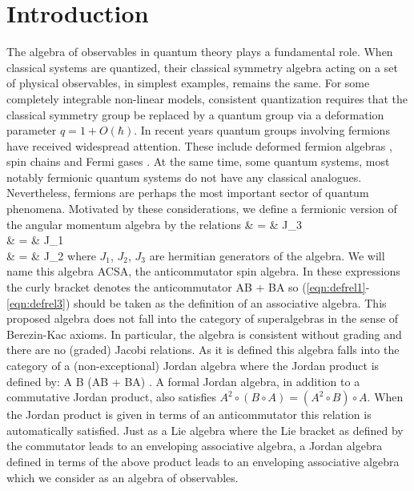 
\section{Introduction}

The algebra of observables in quantum theory plays a fundamental
role. When classical systems are quantized, their classical
symmetry algebra acting on a set of physical observables, in
simplest examples, remains the same. For some completely
integrable non-linear models, consistent quantization requires
that the classical symmetry group be replaced by a quantum group
\cite{frt,drinfeld,woronowicz,manin} via a deformation parameter
$q = 1 + O(\hbar)$. In recent years quantum groups involving
fermions have received widespread attention. These include
deformed fermion algebras \cite{jx,xh,sm,chung}, spin chains
\cite{nt,gppr,bnnpsw} and Fermi gases \cite{ubriaco}. At the same
time, some quantum systems, most notably fermionic quantum systems
do not have any classical analogues. Nevertheless, fermions are
perhaps the most important sector of quantum phenomena. Motivated
by these considerations, we define a fermionic version of the
angular momentum algebra by the relations \pagebreak \bea
{} & = & J_3 \label{eqn:defrel1} \\
 & = & J_1 \label{eqn:defrel2} \\
 & = & J_2 \label{eqn:defrel3} \eea where $J_1$,
$J_2$, $J_3$ are hermitian generators of the algebra. We will name
this algebra ACSA, the anticommutator spin algebra. In these
expressions the curly bracket denotes the anticommutator \beq
{} \equiv AB + BA \eeq so
(\ref{eqn:defrel1}-\ref{eqn:defrel3}) should be taken as the
definition of an associative algebra. This proposed algebra does
not fall into the category of superalgebras in the sense of
Berezin-Kac axioms. In particular, the algebra is consistent
without grading and there are no (graded) Jacobi relations. As it
is defined this algebra falls into the category of a
(non-exceptional) Jordan algebra where the Jordan product is
defined by: \beq A \circ B \equiv {} (AB + BA) \quad . \eeq A
formal Jordan algebra, in addition to a commutative Jordan
product, also satisfies $A^2\circ(B\circ A) = (A^2\circ B)\circ
A$. When the Jordan product is given in terms of an anticommutator
this relation is automatically satisfied. Just as a Lie algebra
where the Lie bracket as defined by the commutator leads to an
enveloping associative algebra, a Jordan algebra defined in terms
of the above product leads to an enveloping associative algebra
which we consider as an algebra of observables.

